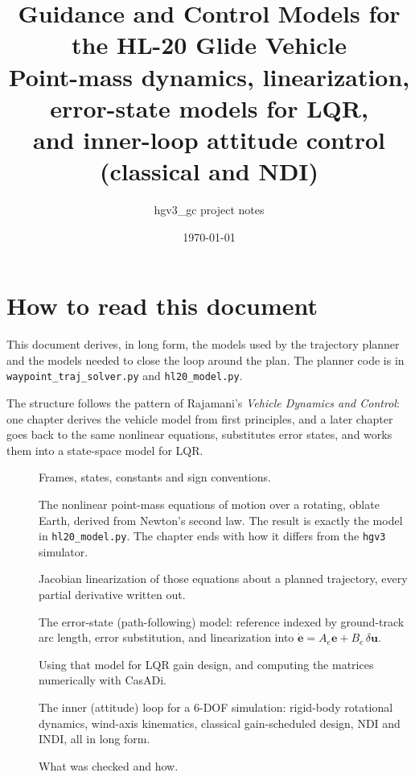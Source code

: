 \documentclass[11pt]{report}
\title{Guidance and Control Models for the HL-20 Glide Vehicle\\[6pt]
\large Point-mass dynamics, linearization, error-state models for LQR,\\
and inner-loop attitude control (classical and NDI)}
\author{hgv3\_gc project notes}
\date{\today}
\numberwithin{equation}{chapter}
\newcommand{\vb}[1]{\bm{#1}}
\newcommand{\code}[1]{\texttt{#1}}
\begin{document}
\maketitle
\tableofcontents

\chapter*{How to read this document}

This document derives, in long form, the models used by the trajectory planner and the
models needed to close the loop around the plan. The planner code is in
\code{waypoint\_traj\_solver.py} and \code{hl20\_model.py}.

The structure follows the pattern of Rajamani's
\emph{Vehicle Dynamics and Control}: one chapter derives the vehicle model from first
principles, and a later chapter goes back to the same nonlinear equations, substitutes
error states, and works them into a state-space model for LQR.

\begin{description}
\item[] Frames, states, constants and sign conventions.
\item[] The nonlinear point-mass equations of motion over a rotating,
  oblate Earth, derived from Newton's second law. The result is exactly the model in
  \code{hl20\_model.py}. The chapter ends with how it differs from the \code{hgv3}
  simulator.
\item[] Jacobian linearization of those equations about a planned
  trajectory, every partial derivative written out.
\item[] The error-state (path-following) model: reference indexed by
  ground-track arc length, error substitution, and linearization into
  $\dot{\vb e} = A_e \vb e + B_e\,\delta\vb u$.
\item[] Using that model for LQR gain design, and computing the matrices
  numerically with CasADi.
\item[] The inner (attitude) loop for a 6-DOF simulation: rigid-body
  rotational dynamics, wind-axis kinematics, classical gain-scheduled design, NDI and
  INDI, all in long form.
\item[] What was checked and how.
\end{description}
\end{document}
